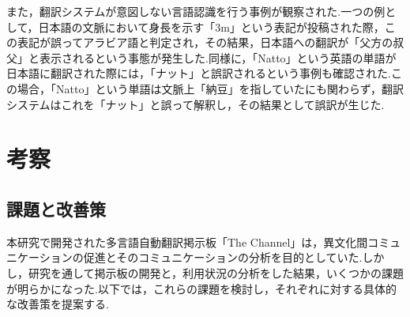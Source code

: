 \documentclass[b5paper,12pt,dvipdfmx]{jsreport}
\begin{document}
また，翻訳システムが意図しない言語認識を行う事例が観察された.一つの例として，日本語の文脈において身長を示す「3m」という表記が投稿された際，この表記が誤ってアラビア語と判定され，その結果，日本語への翻訳が「父方の叔父」と表示されるという事態が発生した.同様に，「Natto」という英語の単語が日本語に翻訳された際には，「ナット」と誤訳されるという事例も確認された.この場合，「Natto」という単語は文脈上「納豆」を指していたにも関わらず，翻訳システムはこれを「ナット」と誤って解釈し，その結果として誤訳が生じた.





\chapter{考察}

\section{課題と改善策}
本研究で開発された多言語自動翻訳掲示板「The Channel」は，異文化間コミュニケーションの促進とそのコミュニケーションの分析を目的としていた.しかし，研究を通して掲示板の開発と，利用状況の分析をした結果，いくつかの課題が明らかになった.以下では，これらの課題を検討し，それぞれに対する具体的な改善策を提案する.
\end{document}
